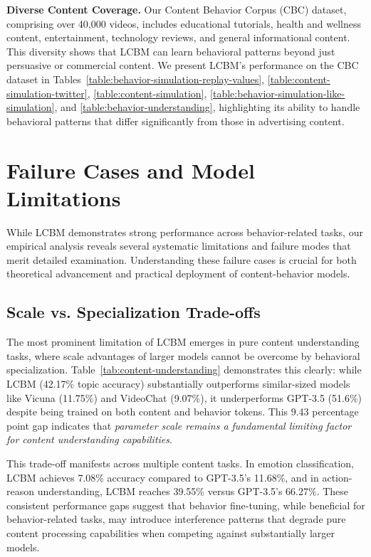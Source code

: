 \textbf{Diverse Content Coverage.} Our Content Behavior Corpus (CBC) dataset, comprising over 40,000 videos, includes educational tutorials, health and wellness content, entertainment, technology reviews, and general informational content. This diversity shows that LCBM can learn behavioral patterns beyond just persuasive or commercial content. We present LCBM's performance on the CBC dataset in Tables~\ref{table:behavior-simulation-replay-values}, \ref{table:content-simulation-twitter}, \ref{table:content-simulation}, \ref{table:behavior-simulation-like-simulation}, and \ref{table:behavior-understanding}, highlighting its ability to handle behavioral patterns that differ significantly from those in advertising content.


\section{Failure Cases and Model Limitations}
\label{sec:failure-cases}

While LCBM demonstrates strong performance across behavior-related tasks, our empirical analysis reveals several systematic limitations and failure modes that merit detailed examination. Understanding these failure cases is crucial for both theoretical advancement and practical deployment of content-behavior models.

\subsection{Scale vs. Specialization Trade-offs}

The most prominent limitation of LCBM emerges in pure content understanding tasks, where scale advantages of larger models cannot be overcome by behavioral specialization. Table~\ref{tab:content-understanding} demonstrates this clearly: while LCBM (42.17\% topic accuracy) substantially outperforms similar-sized models like Vicuna (11.75\%) and VideoChat (9.07\%), it underperforms GPT-3.5 (51.6\%) despite being trained on both content and behavior tokens. This 9.43 percentage point gap indicates that \textit{parameter scale remains a fundamental limiting factor for content understanding capabilities}.

This trade-off manifests across multiple content tasks. In emotion classification, LCBM achieves 7.08\% accuracy compared to GPT-3.5's 11.68\%, and in action-reason understanding, LCBM reaches 39.55\% versus GPT-3.5's 66.27\%. These consistent performance gaps suggest that behavior fine-tuning, while beneficial for behavior-related tasks, may introduce interference patterns that degrade pure content processing capabilities when competing against substantially larger models.

